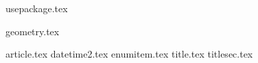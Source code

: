 
{usepackage.tex}


{geometry.tex}

{article.tex}
{datetime2.tex}
{enumitem.tex}
{title.tex}
{titlesec.tex}
